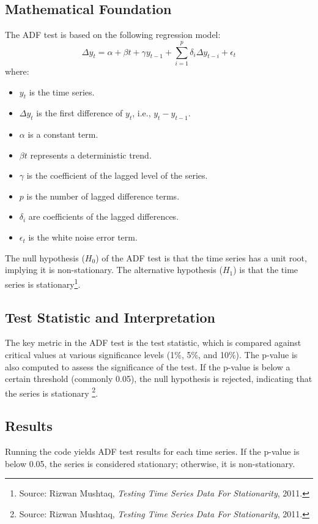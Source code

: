 \documentclass{article}
\begin{document}
\subsection*{Mathematical Foundation}
The ADF test is based on the following regression model:
\[
\Delta y_t = \alpha + \beta t + \gamma y_{t-1} + \sum_{i=1}^p \delta_i \Delta y_{t-i} + \epsilon_t
\]
where:
\begin{itemize}
    \item \( y_t \) is the time series.
    \item \( \Delta y_t \) is the first difference of \( y_t \), i.e., \( y_t - y_{t-1} \).
    \item \( \alpha \) is a constant term.
    \item \( \beta t \) represents a deterministic trend.
    \item \( \gamma \) is the coefficient of the lagged level of the series.
    \item \( p \) is the number of lagged difference terms.
    \item \( \delta_i \) are coefficients of the lagged differences.
    \item \( \epsilon_t \) is the white noise error term.
\end{itemize}

The null hypothesis (\(H_0\)) of the ADF test is that the time series has a unit root, implying it is non-stationary. The alternative hypothesis (\(H_1\)) is that the time series is stationary\footnote{Source: Rizwan Mushtaq, \textit{Testing Time Series Data For Stationarity}, 2011.}.

\subsection*{Test Statistic and Interpretation}
The key metric in the ADF test is the test statistic, which is compared against critical values at various significance levels (1\%, 5\%, and 10\%). The p-value is also computed to assess the significance of the test. If the p-value is below a certain threshold (commonly 0.05), the null hypothesis is rejected, indicating that the series is stationary \footnote{Source: Rizwan Mushtaq, \textit{Testing Time Series Data For Stationarity}, 2011.}.

\subsection*{Results}
Running the code yields ADF test results for each time series. If the p-value is below 0.05, the series is considered stationary; otherwise, it is non-stationary.
\end{document}
